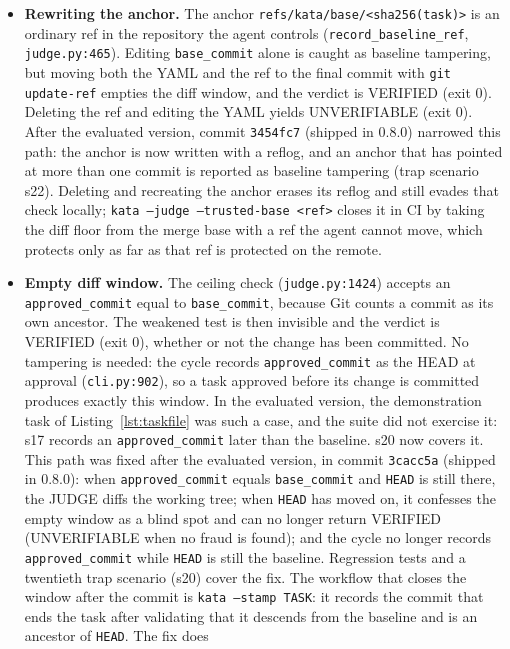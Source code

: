 \documentclass{sbc2019}%
\begin{document}
\begin{itemize}
\item \textbf{Rewriting the anchor.} The anchor
\texttt{refs/kata/base/<sha256(task)>} is an ordinary ref in the repository
the agent controls (\texttt{record\_baseline\_ref}, \texttt{judge.py:465}).
Editing \texttt{base\_commit} alone is caught as baseline tampering, but
moving both the YAML and the ref to the final commit with
\texttt{git update-ref} empties the diff window, and the verdict is VERIFIED
(exit 0). Deleting the ref and editing the YAML yields UNVERIFIABLE (exit 0).
After the evaluated version, commit \texttt{3454fc7} (shipped in 0.8.0) narrowed this path: the
anchor is now written with a reflog, and an anchor that has pointed at more
than one commit is reported as baseline tampering (trap scenario s22).
Deleting and recreating the anchor erases its reflog and still evades that
check locally; \texttt{kata --judge --trusted-base <ref>} closes it in CI by
taking the diff floor from the merge base with a ref the agent cannot move,
which protects only as far as that ref is protected on the remote.
\item \textbf{Empty diff window.} The ceiling check (\texttt{judge.py:1424})
accepts an \texttt{approved\_commit} equal to \texttt{base\_commit}, because
Git counts a commit as its own ancestor. The weakened test is then invisible
and the verdict is VERIFIED (exit 0), whether or not the change has been
committed. No tampering is needed: the cycle records \texttt{approved\_commit}
as the HEAD at approval (\texttt{cli.py:902}), so a task approved before its
change is committed produces exactly this window. In the evaluated version,
the demonstration task of Listing~\ref{lst:taskfile} was such a case, and
the suite did not exercise it: s17 records an \texttt{approved\_commit} later
than the baseline. s20 now covers it. This path was fixed after the evaluated
version, in commit \texttt{3cacc5a} (shipped in 0.8.0): when
\texttt{approved\_commit} equals \texttt{base\_commit} and \texttt{HEAD} is
still there, the JUDGE diffs the working tree; when \texttt{HEAD} has moved
on, it confesses the empty window as a blind spot and can no longer return
VERIFIED (UNVERIFIABLE when no fraud is found); and the cycle no longer
records \texttt{approved\_commit} while \texttt{HEAD} is still the baseline.
Regression tests and a twentieth trap scenario (s20) cover the fix. The
workflow that closes the window after the commit is \texttt{kata --stamp
TASK}: it records the commit that ends the task after validating that it
descends from the baseline and is an ancestor of \texttt{HEAD}. The fix does

\end{itemize}
\end{document}
